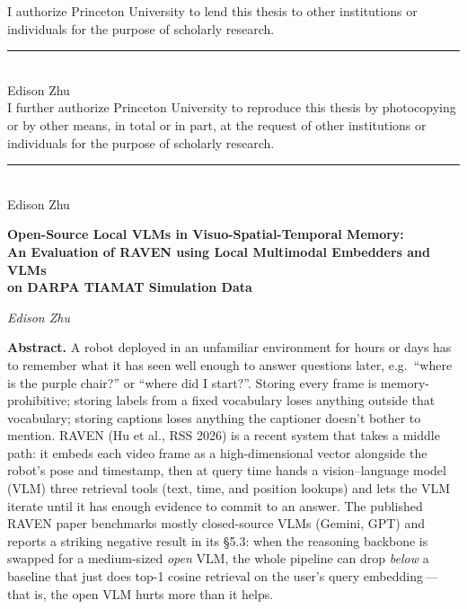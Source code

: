 \documentclass[12pt,letterpaper,oneside]{article}
\begin{document}
\noindent
I authorize Princeton University to lend this thesis to other
institutions or individuals for the purpose of scholarly
research.\\[2em]

\noindent
\rule{3in}{0.4pt}\\
Edison Zhu\\[2.5em]

\noindent
I further authorize Princeton University to reproduce this thesis
by photocopying or by other means, in total or in part, at the
request of other institutions or individuals for the purpose of
scholarly research.\\[2em]

\noindent
\rule{3in}{0.4pt}\\
Edison Zhu
\newpage

\thispagestyle{empty}
\begin{center}
  {\large\bfseries Open-Source Local VLMs in Visuo-Spatial-Temporal Memory:\\
   An Evaluation of RAVEN using Local Multimodal Embedders and VLMs\\
   on DARPA TIAMAT Simulation Data\par}
  \vspace{0.4em}
  {\itshape Edison Zhu\par}
\end{center}
\vspace{0.6em}

\noindent\textbf{Abstract.}
A robot deployed in an unfamiliar environment for hours or days has
to remember what it has seen well enough to answer questions later,
e.g.\ ``where is the purple chair?'' or ``where did I start?''.
Storing every frame is memory-prohibitive; storing labels from a
fixed vocabulary loses anything outside that vocabulary; storing
captions loses anything the captioner doesn't bother to mention.
RAVEN (Hu et al., RSS 2026) is a recent system that takes a middle
path: it embeds each video frame as a high-dimensional vector
alongside the robot's pose and timestamp, then at query time hands a
vision--language model (VLM) three retrieval tools (text, time, and
position lookups) and lets the VLM iterate until it has enough
evidence to commit to an answer. The published RAVEN paper benchmarks
mostly closed-source VLMs (Gemini, GPT) and reports a striking
negative result in its \S5.3: when the reasoning backbone is swapped
for a medium-sized \emph{open} VLM, the whole pipeline can drop
\emph{below} a baseline that just does top-1 cosine retrieval on the
user's query embedding\,---\,that is, the open VLM hurts more than it
helps.
\end{document}

